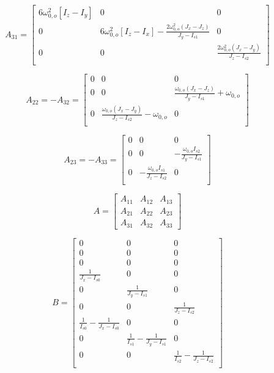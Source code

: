 \[
A_{31} = 
\begin{bmatrix}
	6 \omega_{0,o}^2 \left[I_z - I_y\right]  & 0 & 0 \\
	0 & 6 \omega_{0,o}^2 \left[I_z - I_x\right] - \frac{2 \omega_{0,o}^2 \left(J_x - J_z\right)}{J_y - I_{s1}}
	& 0 \\
	0 & 0 &  \frac{2 \omega_{0,o}^2 \left(J_x - J_y\right)}{J_z - I_{s2}}
	\\
\end{bmatrix}
\]

\[
A_{22} = -A_{32} = 
\begin{bmatrix}
	0  & 0 & 0 \\
	0  & 0 & \frac{\omega_{0,o} \left(J_x - J_z\right)}{J_y - I_{s1}} + \omega_{0,o} \\
	0 & \frac{\omega_{0,o} \left(J_x - J_y\right)}{J_z - I_{s2}} - \omega_{0,o} & 0	\\
\end{bmatrix}
\]

\[
A_{23} = -A_{33} = 
\begin{bmatrix}
	0 & 0 & 0 \\
	0 & 0 & -\frac{\omega_{0,o} I_{s2}}{J_y - I_{s1}}
	\\
	0 & -\frac{\omega_{0,o} I_{s1}}{J_z - I_{s2}}
	& 0 \\
\end{bmatrix}
\]

\[
A =
\begin{bmatrix}
	A_{11} & A_{12} & A_{13} \\
	A_{21} & A_{22} & A_{23} \\
	A_{31} & A_{32} & A_{33}
\end{bmatrix}
\]

\[
B =
\begin{bmatrix}
	0 & 0 & 0 \\
	0 & 0 & 0 \\
	0 & 0 & 0 \\
	\frac{1}{J_{x}-I_{s0}} & 0 & 0 \\
	0 & \frac{1}{J_{y}-I_{s1}} & 0 \\
	0 & 0 & \frac{1}{J_{z}-I_{s2}} \\
	\frac{1}{I_{s0}} - \frac{1}{J_{x}-I_{s0}} & 0 & 0 \\
	0 & \frac{1}{I_{s1}} - \frac{1}{J_{y}-I_{s1}} & 0 \\
	0 & 0 & \frac{1}{I_{s2}} - \frac{1}{J_{z}-I_{s2}} \\
\end{bmatrix}
\]